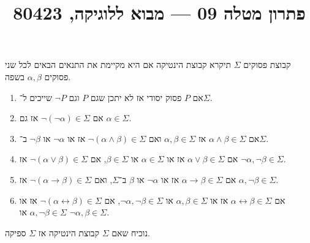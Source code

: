 
\title{פתרון מטלה 09 --- מבוא ללוגיקה, 80423}


\maketitle
\maketitleprint{}

\question{}
קבוצת פסוקים $\Sigma$ תיקרא קבוצת הינטיקה אם היא מקיימת את התנאים הבאים לכל שני פסוקים $\alpha, \beta$ בשפה.
\begin{enumerate}
	\item אם $P$ פסוק יסודי אז לא יתכן שגם $P$ וגם $\lnot P$ שייכים ל־$\Sigma$.
	\item אם $\lnot (\lnot \alpha) \in \Sigma$ אז גם $\alpha \in \Sigma$.
	\item אם $\alpha \land \beta \in \Sigma$ אז $\alpha, \beta \in \Sigma$ ואם $\lnot (\alpha \land \beta) \in \Sigma$ אז או $\lnot \alpha$ או $\lnot \beta$ ב־$\Sigma$.
	\item אם $\alpha \lor \beta \in \Sigma$ אז או $\alpha \in \Sigma$ או $\beta \in \Sigma$, אם $\lnot (\alpha \lor \beta) \in \Sigma$ אז $\lnot \alpha, \lnot \beta \in \Sigma$.
	\item אם $\alpha \to \beta \in \Sigma$ אז או $\lnot \alpha$ או $\beta$ ב־$\Sigma$, ואם $\lnot (\alpha \to \beta) \in \Sigma$ אז $\alpha, \lnot \beta \in \Sigma$.
	\item אם $\alpha \leftrightarrow \beta \in \Sigma$ אז או $\alpha, \beta \in \Sigma$ או $\lnot \alpha, \lnot \beta \in \Sigma$,
		אם $\lnot (\alpha \leftrightarrow \beta) \in \Sigma$ אז או $\alpha, \lnot \beta \in \Sigma$ או $\lnot \alpha, \beta \in \Sigma$.
\end{enumerate}
נוכיח שאם $\Sigma$ קבוצת הינטיקה אז $\Sigma$ ספיקה.
